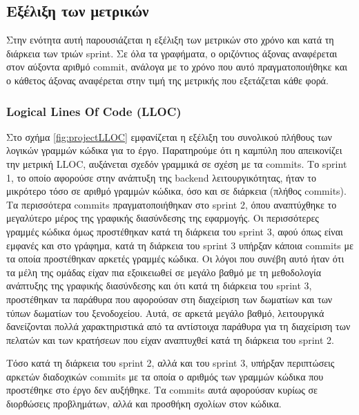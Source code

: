 \subsection{Εξέλιξη των μετρικών}

Στην ενότητα αυτή παρουσιάζεται η εξέλιξη των μετρικών στο χρόνο και
κατά τη διάρκεια των τριών sprint. Σε όλα τα γραφήματα, ο οριζόντιος
άξονας αναφέρεται στον αύξοντα αριθμό commit, ανάλογα με το χρόνο που
αυτό πραγματοποιήθηκε και ο κάθετος άξονας αναφέρεται στην τιμή της
μετρικής που εξετάζεται κάθε φορά.

\subsubsection{Logical Lines Of Code (LLOC)}
\label{section:projectLLOC}

Στο σχήμα \ref{fig:projectLLOC} εμφανίζεται η εξέλιξη του συνολικού
πλήθους των λογικών γραμμών κώδικα για το έργο. Παρατηρούμε ότι η
καμπύλη που απεικονίζει την μετρική LLOC, αυξάνεται σχεδόν γραμμικά σε
σχέση με τα commits. Το sprint 1, το οποίο αφορούσε στην ανάπτυξη της
backend λειτουργικότητας, ήταν το μικρότερο τόσο σε αριθμό γραμμών
κώδικα, όσο και σε διάρκεια (πλήθος commits). Τα περισσότερα commits
πραγματοποιήθηκαν στο sprint 2, όπου αναπτύχθηκε το μεγαλύτερο μέρος της
γραφικής διασύνδεσης της εφαρμογής. Οι περισσότερες γραμμές κώδικα όμως
προστέθηκαν κατά τη διάρκεια του sprint 3, αφού όπως είναι εμφανές και
στο γράφημα, κατά τη διάρκεια του sprint 3 υπήρξαν κάποια commits με τα
οποία προστέθηκαν αρκετές γραμμές κώδικα. Οι λόγοι που συνέβη αυτό ήταν
ότι τα μέλη της ομάδας είχαν πια εξοικειωθεί σε μεγάλο βαθμό με τη
μεθοδολογία ανάπτυξης της γραφικής διασύνδεσης και ότι κατά τη διάρκεια
του sprint 3, προστέθηκαν τα παράθυρα που αφορούσαν στη διαχείριση των
δωματίων και των τύπων δωματίων του ξενοδοχείου. Αυτά, σε αρκετά μεγάλο
βαθμό, λειτουργικά δανείζονται πολλά χαρακτηριστικά από τα αντίστοιχα
παράθυρα για τη διαχείριση των πελατών και των κρατήσεων που είχαν
αναπτυχθεί κατά τη διάρκεια του sprint 2.

Τόσο κατά τη διάρκεια του sprint 2, αλλά και του sprint 3,
υπήρξαν περιπτώσεις αρκετών διαδοχικών commits με τα οποία ο
αριθμός των γραμμών κώδικα που προστέθηκε στο έργο δεν αυξήθηκε.
Τα commits αυτά αφορούσαν κυρίως σε διορθώσεις προβλημάτων, αλλά
και προσθήκη σχολίων στον κώδικα.

